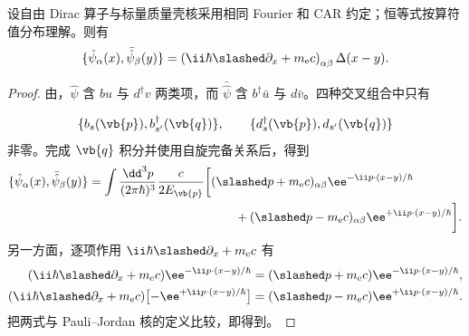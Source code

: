 \begin{proposition}
设自由 Dirac 算子与标量质量壳核采用相同 Fourier 和 CAR 约定；恒等式按算符值分布理解。则有
\begin{equation}
 {
 \{\hat\psi_\alpha(x),\bar{\hat\psi}_\beta(y)\}
 =\left(\ii\hbar\slashed\partial_x+m_{\mathrm e} c\right)_{\alpha\beta}
 \Delta(x-y).}
\label{eq:dirac-PJ-factor-r8}
\end{equation}
\end{proposition}
\begin{proof}
由，$\hat\psi$ 含 $bu$ 与 $d^\dagger v$ 两类项，而 $\bar{\hat\psi}$ 含 $b^\dagger\bar u$ 与 $d\bar v$。四种交叉组合中只有

\begin{equation*}
 \{b_s(\vb{p}),b_{s'}^\dagger(\vb{q})\},
 \qquad
 \{d_s^\dagger(\vb{p}),d_{s'}(\vb{q})\}
\end{equation*}
非零。完成 $\vb{q}$ 积分并使用自旋完备关系后，得到
\begin{align*}
 \{\hat\psi_\alpha(x),\bar{\hat\psi}_\beta(y)\}
 &=\int\frac{\dd^3 p}{(2\pi\hbar)^3}\frac{c}{2E_{\vb{p}}}
 \bigg[
 (\slashed p+m_{\mathrm e} c)_{\alpha\beta}\ee^{-\ii p\cdot(x-y)/\hbar}\\
 &\hspace{42mm}
 +(\slashed p-m_{\mathrm e} c)_{\alpha\beta}\ee^{+\ii p\cdot(x-y)/\hbar}
 \bigg].
\end{align*}
另一方面，逐项作用 $\ii\hbar\slashed\partial_x+m_{\mathrm e} c$ 有
\begin{align*}
 (\ii\hbar\slashed\partial_x+m_{\mathrm e} c)\ee^{-\ii p\cdot(x-y)/\hbar}
 &=(\slashed p+m_{\mathrm e} c)\ee^{-\ii p\cdot(x-y)/\hbar},\\
 (\ii\hbar\slashed\partial_x+m_{\mathrm e} c)
 \bigl[-\ee^{+\ii p\cdot(x-y)/\hbar}\bigr]
 &=(\slashed p-m_{\mathrm e} c)\ee^{+\ii p\cdot(x-y)/\hbar}.
\end{align*}
把两式与 Pauli--Jordan 核的定义比较，即得到。
\end{proof}


